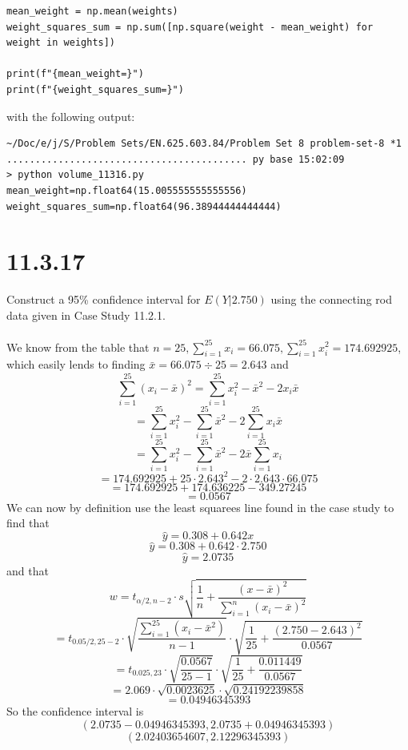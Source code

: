 \documentclass{article}
\begin{document}
{\begin{verbatim}
mean_weight = np.mean(weights)
weight_squares_sum = np.sum([np.square(weight - mean_weight) for weight in weights])

print(f"{mean_weight=}")
print(f"{weight_squares_sum=}")
\end{verbatim}
with the following output:
\begin{verbatim}
~/Doc/e/j/S/Problem Sets/EN.625.603.84/Problem Set 8 problem-set-8 *1 .......................................... py base 15:02:09
> python volume_11316.py 
mean_weight=np.float64(15.005555555555556)
weight_squares_sum=np.float64(96.38944444444444)
\end{verbatim}

\section*{11.3.17}
Construct a 95\% confidence interval for \(E(Y | 2.750) \) using the connecting rod data given in Case Study 11.2.1.
\\
\\
We know from the table that \(n = 25, \sum_{i=1}^{25} x_i = 66.075, \sum_{i=1}^{25} x_i^2 = 174.692925\), which easily lends to finding \(\bar{x} = 66.075 \div 25 = 2.643\) and 
\[
\sum_{i=1}^{25} (x_i - \bar{x})^2 = \sum_{i=1}^{25} x_i^2 - \bar{x}^2 - 2x_i\bar{x}
\]
\[
= \sum_{i=1}^{25} x_i^2 - \sum_{i=1}^{25} \bar{x}^2 - 2\sum_{i=1}^{25} x_i \bar{x}
\]
\[
= \sum_{i=1}^{25} x_i^2 - \sum_{i=1}^{25} \bar{x}^2 - 2\bar{x}\sum_{i=1}^{25} x_i 
\]
\[
= 174.692925 + 25 \cdot 2.643^2 - 2 \cdot 2.643 \cdot 66.075
\]
\[
= 174.692925 + 174.636225 - 349.27245
\]
\[
= 0.0567
\]
We can now by definition use the least squarees line found in the case study to find that 
\[
\hat{y} = 0.308 + 0.642x 
\]
\[
\hat{y} = 0.308 + 0.642 \cdot 2.750
\]
\[
\hat{y} = 2.0735
\]
and that 
\[
w = t_{\alpha / 2, n - 2} \cdot s \sqrt{\frac{1}{n} + \frac{(x - \bar{x})^2}{\sum_{i=1}^{n}(x_i - \bar{x})^2}}
\]
\[
= t_{0.05 / 2, 25 - 2} \cdot \sqrt{\frac{\sum_{i=1}^{25}(x_i - \bar{x}^2)}{n-1}} \cdot \sqrt{\frac{1}{25} + \frac{(2.750  - 2.643)^2}{0.0567}}
\]
\[
= t_{0.025, 23} \cdot \sqrt{\frac{0.0567}{25-1}} \cdot \sqrt{\frac{1}{25} + \frac{0.011449}{0.0567}}
\]
\[
= 2.069 \cdot \sqrt{0.0023625} \cdot \sqrt{0.24192239858}
\]
\[
= 0.04946345393
\]
So the confidence interval is 
\[
(2.0735 - 0.04946345393, 2.0735 + 0.04946345393)
\]
\[
(2.02403654607, 2.12296345393)
\]

}
\end{document}
